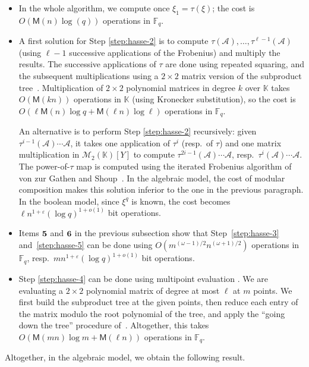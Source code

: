 \documentclass[12pt]{article}
\theoremstyle{plain}
\theoremstyle{definition}
\def\F{\ensuremath{\mathbb{F}}}
\def\K{\ensuremath{\mathbb{K}}}
\def\MM{\ensuremath{\mathsf{M}}}
\begin{document}
\begin{itemize}
\item In the whole algorithm, we compute once $\xi_1=\tau(\xi)$; the
  cost is $O(\MM(n)\log(q))$ operations in $\F_q$.

\item A first solution for Step \ref{step:hasse-2} is to compute $
   \tau(\mathcal{A}), \dots,\tau^{\ell-1}(\mathcal{A})$
  (using $\ell-1$ successive applications of the Frobenius) and
  multiply the results. The successive applications of $\tau$ are
  done using repeated squaring, and the subsequent multiplications
  using a $2 \times 2$ matrix version of the subproduct
  tree~\cite[Chapter~10]{vzGG}.  Multiplication of $2 \times 2$
  polynomial matrices in degree $k$ over $\K$ takes $O(\MM(k n))$
  operations in $\K$ (using Kronecker substitution), so the cost is
  $O(\ell\MM(n)\log q + \MM(\ell n)\log \ell)$ operations in $\F_q$.

  An alternative is to perform Step \ref{step:hasse-2}
  recursively: given $\tau^{i-1}(\mathcal{A})\cdots \mathcal{A}$, it
  takes one application of $\tau^{i}$ (resp.\ of $\tau$) and one
  matrix multiplication in $\mathscr{M}_2(\K)[Y]$ to compute
  $\tau^{2i-1}(\mathcal{A})\cdots \mathcal{A}$,
  resp.\ $\tau^{i}(\mathcal{A})\cdots \mathcal{A}$. 
  The power-of-$\tau$ map is computed using the iterated Frobenius
  algorithm of von zur Gathen and Shoup~\cite{gs}. In the algebraic
  model, the cost of modular composition makes this solution inferior
  to the one in the previous paragraph. In the boolean model, since $\xi^q$
  is known, the cost becomes $\ell n^{1+\varepsilon} (\log q)^{1+o(1)}$
  bit operations.
\item Items ${\bf 5}$ and ${\bf 6}$ in the previous subsection show
  that Step~\ref{step:hasse-3} and~\ref{step:hasse-5} can be done
  using $O(m^{(\omega-1)/2} n^{(\omega+1)/2})$ operations in $\F_q$,
  resp.\ $m n^{1+\varepsilon} (\log q)^{1+o(1)}$ bit operations.
\item Step \ref{step:hasse-4} can be done using multipoint evaluation
  \cite{vzGG}. We are evaluating a $2 \times 2$ polynomial matrix of
  degree at most $\ell$ at $m$ points.  We first build the subproduct
  tree at the given points, then reduce each entry of the matrix
  modulo the root polynomial of the tree, and apply the ``going down the tree''
  procedure of~\cite[Chapter~10]{vzGG}. Altogether, this takes
  $O(\MM(m n) \log m + \MM(\ell n))$ operations in $\F_q$.
\end{itemize}
Altogether, in the algebraic model, we obtain the following result.
\end{document}
